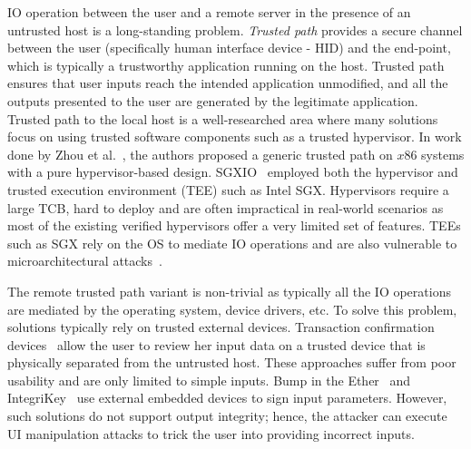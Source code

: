 IO operation between the user and a remote server in the presence of an untrusted host is a long-standing problem. \emph{Trusted path} provides a secure channel between the user (specifically human interface device - HID) and the end-point, which is typically a trustworthy application running on the host. Trusted path ensures that user inputs reach the intended application unmodified, and all the outputs presented to the user are generated by the legitimate application. Trusted path to the local host is a well-researched area where many solutions focus on using trusted software components such as a trusted hypervisor. In work done by Zhou et al.~\cite{zhou2012building}, the authors proposed a generic trusted path on $x86$ systems with a pure hypervisor-based design. SGXIO~\cite{weiser2017sgxio} employed both the hypervisor and trusted execution environment (TEE) such as Intel SGX. Hypervisors require a large TCB, hard to deploy and are often impractical in real-world scenarios as most of the existing verified hypervisors offer a very limited set of features. TEEs such as SGX rely on the OS to mediate IO operations and are also vulnerable to microarchitectural attacks~\cite{van2018foreshadow}.


The remote trusted path variant is non-trivial as typically all the IO operations are mediated by the operating system, device drivers, etc.  To solve this problem, solutions typically rely on trusted external devices. Transaction confirmation devices~\cite{filyanov2011uni,weigold2011secure} allow the user to review her input data on a trusted device that is physically separated from the untrusted host. These approaches suffer from poor usability and are only limited to simple inputs. Bump in the Ether~\cite{McCPerRei2006} and IntegriKey~\cite{IntegriKey} use external embedded devices to sign input parameters. However, such solutions do not support output integrity; hence, the attacker can execute UI manipulation attacks to trick the user into providing incorrect inputs.



